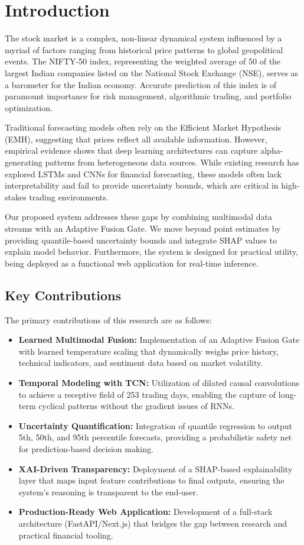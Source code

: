 \documentclass[conference]{IEEEtran}
\begin{document}
\section{Introduction}
The stock market is a complex, non-linear dynamical system influenced by a myriad of factors ranging from historical price patterns to global geopolitical events. The NIFTY-50 index, representing the weighted average of 50 of the largest Indian companies listed on the National Stock Exchange (NSE), serves as a barometer for the Indian economy. Accurate prediction of this index is of paramount importance for risk management, algorithmic trading, and portfolio optimization.

Traditional forecasting models often rely on the Efficient Market Hypothesis (EMH), suggesting that prices reflect all available information. However, empirical evidence shows that deep learning architectures can capture alpha-generating patterns from heterogeneous data sources. While existing research has explored LSTMs and CNNs for financial forecasting, these models often lack interpretability and fail to provide uncertainty bounds, which are critical in high-stakes trading environments.

Our proposed system addresses these gaps by combining multimodal data streams with an Adaptive Fusion Gate. We move beyond point estimates by providing quantile-based uncertainty bounds and integrate SHAP values to explain model behavior. Furthermore, the system is designed for practical utility, being deployed as a functional web application for real-time inference.

\subsection{Key Contributions}
The primary contributions of this research are as follows:
\begin{itemize}
    \item \textbf{Learned Multimodal Fusion:} Implementation of an Adaptive Fusion Gate with learned temperature scaling that dynamically weighs price history, technical indicators, and sentiment data based on market volatility.
    \item \textbf{Temporal Modeling with TCN:} Utilization of dilated causal convolutions to achieve a receptive field of 253 trading days, enabling the capture of long-term cyclical patterns without the gradient issues of RNNs.
    \item \textbf{Uncertainty Quantification:} Integration of quantile regression to output 5th, 50th, and 95th percentile forecasts, providing a probabilistic safety net for prediction-based decision making.
    \item \textbf{XAI-Driven Transparency:} Deployment of a SHAP-based explainability layer that maps input feature contributions to final outputs, ensuring the system's reasoning is transparent to the end-user.
    \item \textbf{Production-Ready Web Application:} Development of a full-stack architecture (FastAPI/Next.js) that bridges the gap between research and practical financial tooling.
\end{itemize}
\end{document}
